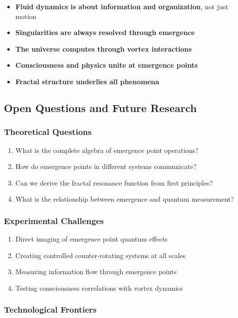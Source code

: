 \documentclass[12pt]{article}
\begin{document}
\begin{itemize}
\item \textbf{Fluid dynamics is about information and organization}, not just motion
\item \textbf{Singularities are always resolved through emergence}
\item \textbf{The universe computes through vortex interactions}
\item \textbf{Consciousness and physics unite at emergence points}
\item \textbf{Fractal structure underlies all phenomena}
\end{itemize}

\subsection{Open Questions and Future Research}

\subsubsection{Theoretical Questions}

\begin{enumerate}
\item What is the complete algebra of emergence point operations?
\item How do emergence points in different systems communicate?
\item Can we derive the fractal resonance function from first principles?
\item What is the relationship between emergence and quantum measurement?
\end{enumerate}

\subsubsection{Experimental Challenges}

\begin{enumerate}
\item Direct imaging of emergence point quantum effects
\item Creating controlled counter-rotating systems at all scales
\item Measuring information flow through emergence points
\item Testing consciousness correlations with vortex dynamics
\end{enumerate}

\subsubsection{Technological Frontiers}
\end{document}
